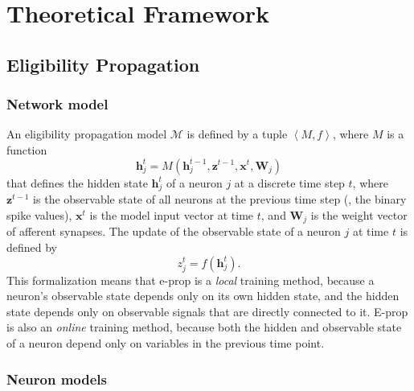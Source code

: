 \chapter{Theoretical Framework}\label{ch:relatedwork}

\section{Eligibility Propagation}

    \subsection{Network model}
        An eligibility propagation model $\mathcal{M}$ is defined by a tuple $\left<M, f\right>$,
        where $M$ is a function
        \begin{equation}\label{eq:model}
        \mathbf{h}^t_j = M\left(\mathbf{h}_j^{t-1}, \mathbf{z}^{t-1}, \mathbf{x}^t, \mathbf{W}_j\right)
        \end{equation}
        that defines the hidden state $\mathbf{h}_j^t$ of a neuron $j$ at a discrete time step $t$, where $\mathbf{z}^{t-1}$ is the observable state of all neurons at the previous time step (\ie, the binary spike values), $\mathbf{x}^t$ is the model input vector at time $t$, and $\mathbf{W}_j$ is the weight vector of afferent synapses.
        The update of the observable state of a neuron $j$ at time $t$ is defined by
        \begin{equation}
        z^t_j = f\left(\mathbf{h}_j^t\right).
        \end{equation}
        This formalization means that e-prop is a \emph{local} training method, because a neuron's observable state depends only on its own hidden state, and the hidden state depends only on observable signals that are directly connected to it.
        E-prop is also an \emph{online} training method, because both the hidden and observable state of a neuron depend only on variables in the previous time point.

    \subsection{Neuron models}\label{sec:alif}

